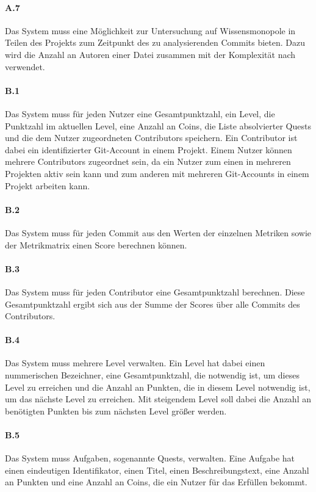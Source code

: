 \documentclass[
	oneside,  %
	ngerman, 
	final, 
	11pt, 
	a4paper, 
	1.1headlines, 
	headinclude=false, 
	footinclude=false, 
	mpinclude=false, 
	pagesize, 
	onecolumn, 
	titlepage, 
	parskip=half, 
	headsepline, 
	chapterprefix=false, 
	version=first, 
	listof=totoc, 
	bibliography=totoc, 
	toc=graduated, 
	fleqn
]{scrbook}
\begin{document}
\paragraph{A.7}
Das System muss eine Möglichkeit zur Untersuchung auf Wissensmonopole in Teilen des Projekts zum Zeitpunkt des zu analysierenden Commits bieten.
Dazu wird die Anzahl an Autoren einer Datei zusammen mit der Komplexität nach \cite{MC1976} verwendet.

\paragraph{B.1}
Das System muss für jeden Nutzer eine Gesamtpunktzahl, ein Level, die Punktzahl im aktuellen Level, eine Anzahl an Coins, die Liste absolvierter Quests und die dem Nutzer zugeordneten Contributors speichern.
Ein Contributor ist dabei ein identifizierter Git-Account in einem Projekt.
Einem Nutzer können mehrere Contributors zugeordnet sein, da ein Nutzer zum einen in mehreren Projekten aktiv sein kann und zum anderen mit mehreren Git-Accounts in einem Projekt arbeiten kann.

\paragraph{B.2}
Das System muss für jeden Commit aus den Werten der einzelnen Metriken sowie der Metrikmatrix einen Score berechnen können.

\paragraph{B.3}
Das System muss für jeden Contributor eine Gesamtpunktzahl berechnen.
Diese Gesamtpunktzahl ergibt sich aus der Summe der Scores über alle Commits des Contributors.

\paragraph{B.4}
Das System muss mehrere Level verwalten.
Ein Level hat dabei einen nummerischen Bezeichner, eine Gesamtpunktzahl, die notwendig ist, um dieses Level zu erreichen und die Anzahl an Punkten, die in diesem Level notwendig ist, um das nächste Level zu erreichen.
Mit steigendem Level soll dabei die Anzahl an benötigten Punkten bis zum nächsten Level größer werden.

\paragraph{B.5}
Das System muss Aufgaben, sogenannte Quests, verwalten.
Eine Aufgabe hat einen eindeutigen Identifikator, einen Titel, einen Beschreibungstext, eine Anzahl an Punkten und eine Anzahl an Coins, die ein Nutzer für das Erfüllen bekommt.
\end{document}
